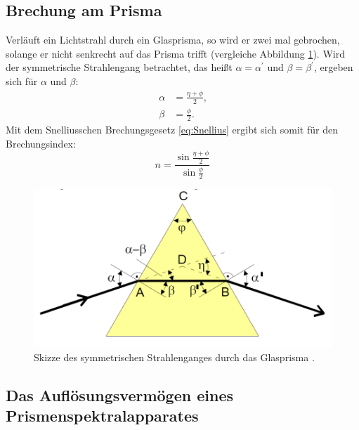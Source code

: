 \subsection{Brechung am Prisma}

Verläuft ein Lichtstrahl durch ein Glasprisma, so wird er zwei mal gebrochen, solange er nicht senkrecht auf das Prisma trifft (vergleiche Abbildung \ref{fig:Prisma}). Wird der symmetrische Strahlengang betrachtet, das heißt $\alpha =\alpha^\prime$ und $\beta =\beta^\prime$, ergeben sich für $\alpha$ und $\beta$:
\begin{align*}
\alpha 	&= \frac{\eta+\phi}{2}\text{,}\\
\beta 	&= \frac{\phi}{2}\text{.}
\end{align*}
Mit dem Snelliusschen Brechungsgesetz \eqref{eq:Snellius} ergibt sich somit für den Brechungsindex:
\begin{equation}
n = \frac{\sin\frac{\eta +\phi}{2}}{\sin\frac{\phi}{2}}\label{eq:n}
\end{equation}

\begin{figure}
\centering
\includegraphics[width=\linewidth-50pt,height=\textheight-50pt,keepaspectratio]{content/images/Prisma.png}
\caption{Skizze des symmetrischen Strahlenganges durch das Glasprisma \cite{V402}.}
\label{fig:Prisma}
\end{figure}

\subsection{Das Auflösungsvermögen eines Prismenspektralapparates}

